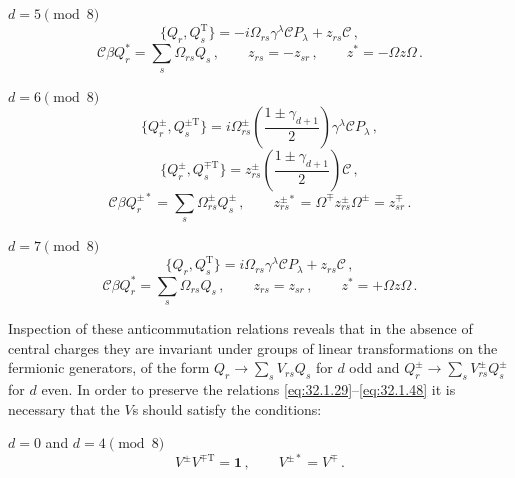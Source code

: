 \medskip
\noindent \(d=5\pmod 8\)
\begin{equation}
  \{Q_r,Q_s^{\mathrm T}\}
  =-i\Omega_{rs}\gamma^\lambda\mathcal C P_\lambda
   +z_{rs}\mathcal C\,,
  \tag{32.1.42}\label{eq:32.1.42}
\end{equation}
\begin{equation}
  \mathcal C\beta Q_r^*=\sum_s\Omega_{rs}Q_s\,,
  \qquad
  z_{rs}=-z_{sr}\,,
  \qquad
  z^*=-\Omega z\Omega\,.
  \tag{32.1.43}\label{eq:32.1.43}
\end{equation}

\medskip
\noindent \(d=6\pmod 8\)
\begin{equation}
  \{Q_r^\pm,Q_s^{\pm\mathrm T}\}
  =i\Omega_{rs}^{\pm}
  \left(\frac{1\pm\gamma_{d+1}}{2}\right)
  \gamma^\lambda\mathcal C P_\lambda\,,
  \tag{32.1.44}\label{eq:32.1.44}
\end{equation}
\begin{equation}
  \{Q_r^\pm,Q_s^{\mp\mathrm T}\}
  =z_{rs}^{\pm}
  \left(\frac{1\pm\gamma_{d+1}}{2}\right)\mathcal C\,,
  \tag{32.1.45}\label{eq:32.1.45}
\end{equation}
\begin{equation}
  \mathcal C\beta Q_r^{\pm*}
  =\sum_s\Omega_{rs}^{\pm}Q_s^\pm\,,
  \qquad
  z_{rs}^{\pm*}
  =\Omega^\mp z_{rs}^{\pm}\Omega^\pm
  =z_{sr}^{\mp}\,.
  \tag{32.1.46}\label{eq:32.1.46}
\end{equation}

\medskip
\noindent \(d=7\pmod 8\)
\begin{equation}
  \{Q_r,Q_s^{\mathrm T}\}
  =i\Omega_{rs}\gamma^\lambda\mathcal C P_\lambda
   +z_{rs}\mathcal C\,,
  \tag{32.1.47}\label{eq:32.1.47}
\end{equation}
\begin{equation}
  \mathcal C\beta Q_r^*=\sum_s\Omega_{rs}Q_s\,,
  \qquad
  z_{rs}=z_{sr}\,,
  \qquad
  z^*=+\Omega z\Omega\,.
  \tag{32.1.48}\label{eq:32.1.48}
\end{equation}

Inspection of these anticommutation relations reveals that in the absence
of central charges they are invariant under groups of linear transformations
on the fermionic generators, of the form
\(Q_r\longrightarrow\sum_sV_{rs}Q_s\) for \(d\) odd and
\(Q_r^\pm\longrightarrow\sum_sV_{rs}^\pm Q_s^\pm\) for \(d\) even. In
order to preserve the relations \eqref{eq:32.1.29}--\eqref{eq:32.1.48} it
is necessary that the \(V\)s should satisfy the conditions:

\medskip
\noindent \(d=0\) and \(d=4\pmod 8\)
\begin{equation}
  V^\pm V^{\mp\mathrm T}=\mathbf{1}\,,
  \qquad V^{\pm*}=V^\mp\,.
  \tag{32.1.49}\label{eq:32.1.49}
\end{equation}

